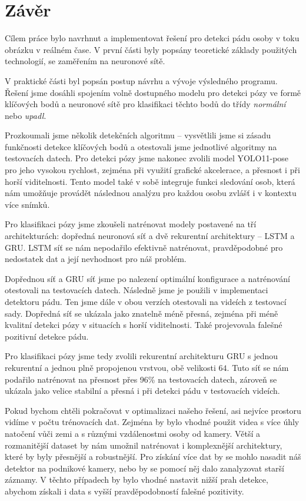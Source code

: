 \chapter{Závěr}
\label{chap:Conclusion}

Cílem práce bylo navrhnut a implementovat řešení pro detekci pádu osoby v toku
obrázku v reálném čase. V první části byly popsány teoretické základy použitých
technologií, se zaměřením na neuronové sítě.

V praktické části byl popsán postup návrhu a vývoje výsledného programu. Řešení
jsme dosáhli spojením volně dostupného modelu pro detekci pózy ve formě
klíčových bodů a neuronové sítě pro klasifikaci těchto bodů do třídy
\textit{normální} nebo \textit{upadl}.

Prozkoumali jsme několik detekčních algoritmu – vysvětlili jsme si zásadu
funkčnosti detekce klíčových bodů a otestovali jsme jednotlivé algoritmy na
testovacích datech. Pro detekci pózy jsme nakonec zvolili model YOLO11-pose pro
jeho vysokou rychlost, zejména při využití grafické akcelerace, a přesnost i
při horší viditelnosti. Tento model také v sobě integruje funkci sledování
osob, která nám umožňuje provádět následnou analýzu pro každou osobu zvlášť i v
kontextu více snímků.

Pro klasifikaci pózy jsme zkoušeli natrénovat modely postavené na tří
architekturách: dopředná neuronová síť a dvě rekurentní architektury – LSTM a
GRU. LSTM síť se nám nepodařilo efektivně natrénovat, pravděpodobné pro
nedostatek dat a její nevhodnost pro náš problém.

Dopřednou síť a GRU síť jsme po nalezení optimální konfigurace a natrénování
otestovali na testovacích datech. Následně jsme je použili v implementaci
detektoru pádu. Ten jsme dále v obou verzích otestovali na videích z testovací
sady. Dopředná síť se ukázala jako znatelně méně přesná, zejména při méně
kvalitní detekci pózy v situacích s horší viditelnosti. Také projevovala
falešné pozitivní detekce pádu.

Pro klasifikaci pózy jsme tedy zvolili rekurentní architekturu GRU s jednou
rekurentní a jednou plně propojenou vrstvou, obě velikosti $64$. Tuto síť se
nám podařilo natrénovat na přesnost přes 96\% na testovacích datech, zároveň se
ukázala jako velice stabilní a přesná i při detekci pádu v testovacích videích.

Pokud bychom chtěli pokračovat v optimalizaci našeho řešení, asi nejvíce
prostoru vidíme v počtu trénovacích dat. Zejména by bylo vhodné použit videa s
více úhly natočení vůči zemi a s různými vzdálenostmi osoby od kamery. Větší a
rozmanitější dataset by nám umožnil natrénovat i komplexnější architektury,
které by byly přesnější a robustnější. Pro získání více dat by se mohlo nasadit
náš detektor na podnikové kamery, nebo by se pomocí něj dalo zanalyzovat starší
záznamy. V těchto případech by bylo vhodné nastavit nižší prah detekce, abychom
získali i data s vyšší pravděpodobností falešné pozitivity.

